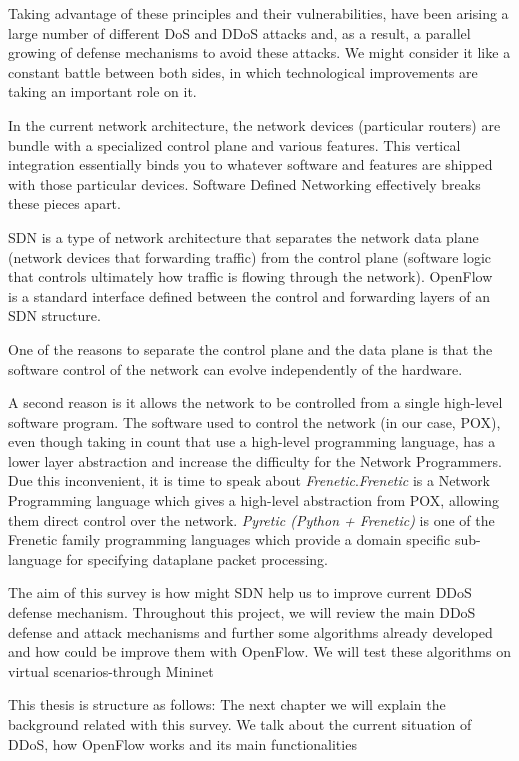 \bigskip

Taking advantage of these principles and their vulnerabilities, have been arising a large number of different DoS and DDoS attacks and, as a result, a parallel growing of defense mechanisms to avoid these attacks. We might consider it like a constant battle between both sides, in which technological improvements are taking an important role on it. 
 
\par

In the current network architecture, the network devices (particular routers) are bundle with a specialized control plane and various features. This vertical integration essentially binds you to whatever software and features are shipped with those particular devices. Software Defined Networking effectively breaks these pieces apart.

\par

SDN is a type of network architecture that separates the network data plane (network devices that forwarding traffic) from the control plane (software logic that controls ultimately how traffic is flowing through the network). OpenFlow~\cite{OpenFlowWP} is a standard interface defined between the control and forwarding layers of an SDN structure. 

\par

One of the reasons to separate the control plane and the data plane is that the software control of the network can evolve independently of the hardware. 

\par

A second reason is it allows the network to be controlled from a single high-level software program. The software used to control the network (in our case, POX), even though taking in count that use a high-level programming language, has a lower layer abstraction and increase the difficulty for the Network Programmers. Due this inconvenient, it is time to speak about \textit{Frenetic}.\textit{Frenetic} is a Network Programming language which gives a high-level abstraction from POX, allowing them direct control over the network. \textit{Pyretic (Python + Frenetic)} is one of the Frenetic family programming languages which provide a domain specific sub-language for specifying dataplane packet processing.

\par

The aim of this survey is how might SDN help us to improve current DDoS defense mechanism. Throughout this project, we will review the main DDoS defense and attack mechanisms and further some algorithms already developed and how could be improve them with OpenFlow. We will test these algorithms on virtual scenarios-through Mininet

\bigskip

This thesis is structure as follows: The next chapter we will explain the background related with this survey. We talk about the current situation of DDoS, how OpenFlow works and its main functionalities 



